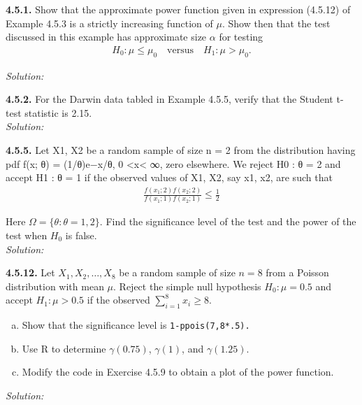 \documentclass{book}
\theoremstyle{definition}
\newcommand{\f}[2]{\frac{#1}{#2}}
\begin{document}
\newpage
\noindent\textbf{4.5.1.} Show that the approximate power function given in expression (4.5.12) of
Example 4.5.3 is a strictly increasing function of $\mu$. Show then that the test discussed
in this example has approximate size $\alpha$ for testing
\begin{align}
H_0: \mu \leq \mu_0\quad \text{versus} \quad H_1: \mu > \mu_0.
\end{align}


\noindent \textit{Solution:} 



\newpage
\noindent\textbf{4.5.2.} For the Darwin data tabled in Example 4.5.5, verify that the Student t-test
statistic is 2.15. \\


\noindent \textit{Solution:} 




\newpage
\noindent\textbf{4.5.5.} Let X1, X2 be a random sample of size n = 2 from the distribution having
pdf f(x; θ) = (1/θ)e−x/θ, 0 <x< ∞, zero elsewhere. We reject H0 : θ = 2 and
accept H1 : θ = 1 if the observed values of X1, X2, say x1, x2, are such that
\begin{align}
\f{f(x_1;2)f(x_2;2)}{f(x_1;1)f(x_2;1)} \leq \f{1}{2}
\end{align}



Here $\Omega = \{θ : θ = 1, 2\}$. Find the significance level of the test and the power of the
test when $H_0$ is false.\\



\noindent \textit{Solution:} 


\newpage
\noindent\textbf{4.5.12.} Let $X_1, X_2,\dots,X_8$ be a random sample of size $n = 8$ from a Poisson
distribution with mean $\mu$. Reject the simple null hypothesis $H_0 : \mu = 0.5$ and
accept $H_1 : \mu > 0.5$ if the observed $\sum^8_{i=1} x_i \geq 8.$
\begin{enumerate}[(a)]
	\item Show that the significance level is \texttt{1-ppois(7,8*.5).}
	\item Use R to determine $\gamma(0.75)$, $\gamma(1)$, and $\gamma(1.25)$.
	\item Modify the code in Exercise 4.5.9 to obtain a plot of the power function.
\end{enumerate}


\noindent \textit{Solution:} 
\end{document}
